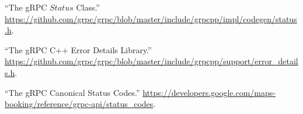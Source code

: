 \documentclass[11pt]{article}
\begin{document}
{{\begin{thebibliography}{44}
\mdbibitemlabel{{}[37]}\textquotedblleft{}The gRPC $Status$ Class.\textquotedblright{} \href{https://github.com/grpc/grpc/blob/master/include/grpcpp/impl/codegen/status.h}{{\ttfamily https://\hspace{0pt}github.\hspace{0pt}com/\hspace{0pt}grpc/\hspace{0pt}grpc/\hspace{0pt}blob/\hspace{0pt}master/\hspace{0pt}include/\hspace{0pt}grpcpp/\hspace{0pt}impl/\hspace{0pt}codegen/\hspace{0pt}status.\hspace{0pt}h}}.\label{grpcstatus}%

\mdbibitemlabel{{}[38]}\textquotedblleft{}The gRPC C++ Error Details Library.\textquotedblright{} \href{https://github.com/grpc/grpc/blob/master/include/grpcpp/support/error_details.h}{{\ttfamily https://\hspace{0pt}github.\hspace{0pt}com/\hspace{0pt}grpc/\hspace{0pt}grpc/\hspace{0pt}blob/\hspace{0pt}master/\hspace{0pt}include/\hspace{0pt}grpcpp/\hspace{0pt}support/\hspace{0pt}error\_\hspace{0pt}details.\hspace{0pt}h}}.\label{grpcerrordetails}%

\mdbibitemlabel{{}[39]}\textquotedblleft{}The gRPC Canonical Status Codes.\textquotedblright{} \href{https://developers.google.com/maps-booking/reference/grpc-api/status_codes}{{\ttfamily https://\hspace{0pt}developers.\hspace{0pt}google.\hspace{0pt}com/\hspace{0pt}maps-\hspace{0pt}booking/\hspace{0pt}reference/\hspace{0pt}grpc-\hspace{0pt}api/\hspace{0pt}status\_\hspace{0pt}codes}}.\label{grpcstatuscodes}%


\end{thebibliography}}}
\end{document}
